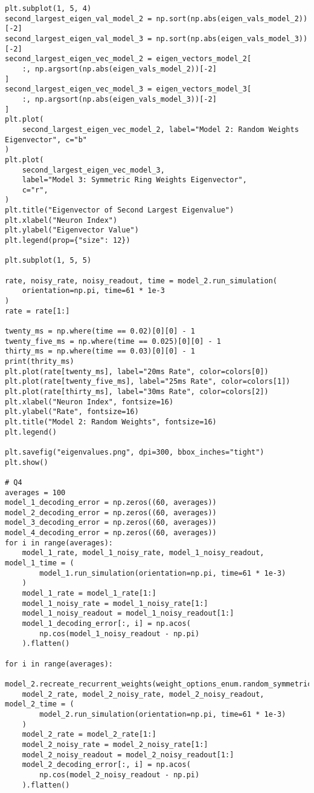 \documentclass[a4paper, 11pt, oneside]{report}
\begin{document}
\begin{verbatim}
plt.subplot(1, 5, 4)
second_largest_eigen_val_model_2 = np.sort(np.abs(eigen_vals_model_2))[-2]
second_largest_eigen_val_model_3 = np.sort(np.abs(eigen_vals_model_3))[-2]
second_largest_eigen_vec_model_2 = eigen_vectors_model_2[
    :, np.argsort(np.abs(eigen_vals_model_2))[-2]
]
second_largest_eigen_vec_model_3 = eigen_vectors_model_3[
    :, np.argsort(np.abs(eigen_vals_model_3))[-2]
]
plt.plot(
    second_largest_eigen_vec_model_2, label="Model 2: Random Weights Eigenvector", c="b"
)
plt.plot(
    second_largest_eigen_vec_model_3,
    label="Model 3: Symmetric Ring Weights Eigenvector",
    c="r",
)
plt.title("Eigenvector of Second Largest Eigenvalue")
plt.xlabel("Neuron Index")
plt.ylabel("Eigenvector Value")
plt.legend(prop={"size": 12})

plt.subplot(1, 5, 5)

rate, noisy_rate, noisy_readout, time = model_2.run_simulation(
    orientation=np.pi, time=61 * 1e-3
)
rate = rate[1:]

twenty_ms = np.where(time == 0.02)[0][0] - 1
twenty_five_ms = np.where(time == 0.025)[0][0] - 1
thirty_ms = np.where(time == 0.03)[0][0] - 1
print(thrity_ms)
plt.plot(rate[twenty_ms], label="20ms Rate", color=colors[0])
plt.plot(rate[twenty_five_ms], label="25ms Rate", color=colors[1])
plt.plot(rate[thirty_ms], label="30ms Rate", color=colors[2])
plt.xlabel("Neuron Index", fontsize=16)
plt.ylabel("Rate", fontsize=16)
plt.title("Model 2: Random Weights", fontsize=16)
plt.legend()

plt.savefig("eigenvalues.png", dpi=300, bbox_inches="tight")
plt.show()

# Q4
averages = 100
model_1_decoding_error = np.zeros((60, averages))
model_2_decoding_error = np.zeros((60, averages))
model_3_decoding_error = np.zeros((60, averages))
model_4_decoding_error = np.zeros((60, averages))
for i in range(averages):
    model_1_rate, model_1_noisy_rate, model_1_noisy_readout, model_1_time = (
        model_1.run_simulation(orientation=np.pi, time=61 * 1e-3)
    )
    model_1_rate = model_1_rate[1:]
    model_1_noisy_rate = model_1_noisy_rate[1:]
    model_1_noisy_readout = model_1_noisy_readout[1:]
    model_1_decoding_error[:, i] = np.acos(
        np.cos(model_1_noisy_readout - np.pi)
    ).flatten()

for i in range(averages):
    model_2.recreate_recurrent_weights(weight_options_enum.random_symmetric)
    model_2_rate, model_2_noisy_rate, model_2_noisy_readout, model_2_time = (
        model_2.run_simulation(orientation=np.pi, time=61 * 1e-3)
    )
    model_2_rate = model_2_rate[1:]
    model_2_noisy_rate = model_2_noisy_rate[1:]
    model_2_noisy_readout = model_2_noisy_readout[1:]
    model_2_decoding_error[:, i] = np.acos(
        np.cos(model_2_noisy_readout - np.pi)
    ).flatten()


\end{verbatim}
\end{document}

